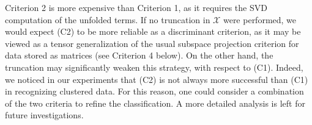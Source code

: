 \documentclass{siamart190516}
\newcommand{\cc}[1]{\mathcal{#1}}
\newcommand{\cX}{\cc X}
\begin{document}

\vskip 0.1in
Criterion 2 is more expensive than Criterion 1,
as it requires the SVD computation of the unfolded terms. If no truncation in $\cX$ were performed,
we would expect (C2) to be  more reliable
as a discriminant criterion, as it may be viewed
as a tensor generalization of the usual subspace
projection criterion for data stored as matrices (see Criterion 4 below).
On the other hand, the truncation may significantly
weaken this strategy, with respect to (C1).
Indeed, we noticed in our experiments that (C2)
is not always more successful than (C1) in
recognizing clustered data. For this reason, one could consider a combination of the two criteria to refine the classification. A more detailed analysis
is left for future investigations.
\end{document}
